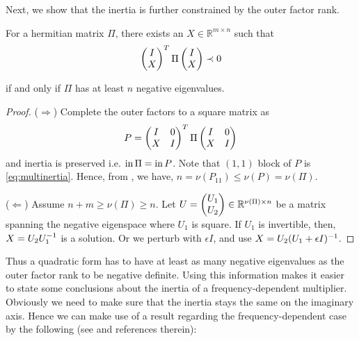 Next, we show that the inertia is further constrained by the outer factor rank. 
\begin{lem}\label{lem:inertialemma} For a hermitian matrix $\Pi$, there exists an $X\in \mathbb{R}^{m\times n}$ such that 
\begin{equation}
\begin{pmatrix}I\\X\end{pmatrix}^T\Pi\begin{pmatrix}I\\X\end{pmatrix} \prec 0
\label{eq:multinertia}
\end{equation}

if and only if $\Pi$ has at least $n$ negative eigenvalues.
\end{lem}

\begin{proof} ($\Rightarrow$) Complete the outer factors to a square matrix as
\[
P = \begin{pmatrix}I &0\\X &I\end{pmatrix}^T\Pi\begin{pmatrix}I &0\\X &I\end{pmatrix}
\]
and inertia is preserved i.e. $\operatorname{in} \Pi = \operatorname{in} P$. Note that $(1,1)$ block of $P$ is \eqref{eq:multinertia}. 
Hence, from , we have, $n = \nu(P_{11})\leq \nu({P}) = \nu(\Pi)$.


($\Leftarrow$) Assume $n+m \geq \nu(\Pi)\geq n$. Let $U = \begin{pmatrix}U_1\\U_2\end{pmatrix} \in\mathbb{R}^{\nu(\Pi)\times n}$ be a 
matrix spanning the negative eigenspace where $U_1$ is square. If $U_1$ is invertible, then, $X = U_2U_1^{-1}$ 
is a solution. Or we perturb with $\epsilon I$, and use $X= U_2(U_1+\epsilon I)^{-1}$. 
\end{proof}
Thus a quadratic form has to have at least as many negative eigenvalues as the outer factor rank to be negative definite. 
Using this information makes it easier to state some conclusions about the inertia of a frequency-dependent multiplier. 
Obviously we need to make sure that the inertia stays the same on the imaginary axis. Hence we can make use of a result 
regarding the frequency-dependent case by the following (see \cite{megretskitreil} and references therein):

